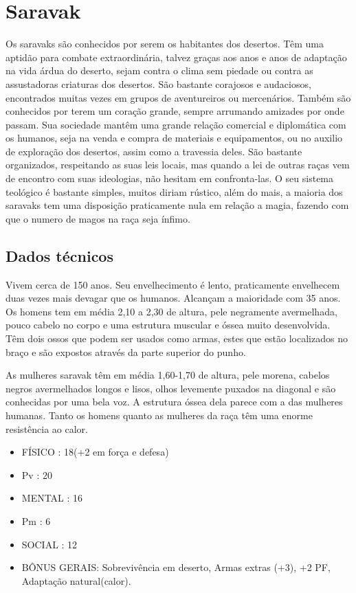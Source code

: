 \section{Saravak}

Os saravaks são conhecidos por serem os habitantes dos desertos. Têm uma aptidão para combate extraordinária, talvez graças aos anos e anos de adaptação na vida árdua do deserto, sejam contra o clima sem piedade ou contra as assustadoras criaturas dos desertos. São bastante corajosos e audaciosos, encontrados muitas vezes em grupos de aventureiros ou mercenários. Também são conhecidos por terem um coração grande, sempre arrumando amizades por onde passam. Sua sociedade mantêm uma grande relação comercial e diplomática com os humanos, seja na venda e compra de materiais e equipamentos, ou no auxilio de exploração dos desertos, assim como a travessia deles. São bastante organizados, respeitando as suas leis locais, mas quando a lei de outras raças vem de encontro com suas ideologias, não hesitam em confronta-las. O seu sistema teológico é bastante simples, muitos diriam rústico, além do mais, a maioria dos saravaks tem uma disposição praticamente nula em relação a magia, fazendo com que o numero de magos na raça seja ínfimo.

\subsection{Dados técnicos}


Vivem cerca de 150 anos. Seu envelhecimento é lento, praticamente envelhecem duas vezes mais devagar que os humanos. Alcançam a maioridade com 35 anos. Os homens tem em média 2,10 a 2,30 de altura, pele negramente avermelhada, pouco cabelo no corpo e uma estrutura muscular e óssea muito desenvolvida. Têm dois ossos que podem ser usados como armas, estes que estão localizados no braço e são expostos através da parte superior do punho. 

As mulheres saravak têm em média 1,60-1,70 de altura, pele morena, cabelos negros avermelhados longos e lisos, olhos levemente puxados na diagonal e são conhecidas por uma bela voz. A estrutura óssea dela parece com a das mulheres humanas. Tanto os homens quanto as mulheres da raça têm uma enorme resistência ao calor.


\begin{itemize}
\item	FÍSICO : 18(+2 em força e defesa)
\item Pv : 20 

\item MENTAL : 16
\item Pm : 6

\item SOCIAL : 12

\item BÔNUS GERAIS: Sobrevivência em deserto, Armas extras (+3), +2 PF, Adaptação natural(calor).

\end{itemize}

